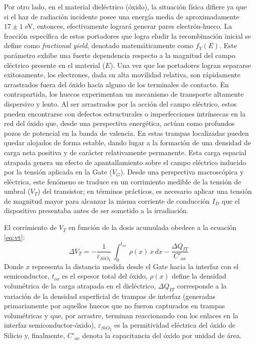 \documentclass[12pt,a4paper,oneside]{book}
\begin{document}
Por otro lado, en el material dieléctrico (óxido), la situación física difiere ya que si el haz de radiación incidente posee una energía media de aproximadamente $17 \pm 1$ eV, entonces, efectivamente logrará generar pares electrón-hueco. La fracción específica de estos portadores que logra eludir la recombinación inicial se define como \textit{fractional yield}, denotado matemáticamente como $f_Y(E)$. Este parámetro exhibe una fuerte dependencia respecto a la magnitud del campo eléctrico presente en el material ($E$). Una vez que los portadores logran separarse exitosamente, los electrones, dada su alta movilidad relativa, son rápidamente arrastrados fuera del óxido hacia alguno de los terminales de contacto. En contrapartida, los huecos experimentan un mecanismo de transporte altamente dispersivo y lento. Al ser arrastrados por la acción del campo eléctrico, estos pueden encontrarse con defectos estructurales o imperfecciones intrínsecas en la red del óxido que, desde una perspectiva energética, actúan como profundos pozos de potencial en la banda de valencia. En estas trampas localizadas pueden quedar alojados de forma estable, dando lugar a la formación de una densidad de carga neta positiva y de carácter relativamente permanente. Esta carga espacial atrapada genera un efecto de apantallamiento sobre el campo eléctrico inducido por la tensión aplicada en la Gate ($V_G$). Desde una perspectiva macroscópica y eléctrica, este fenómeno se traduce en un corrimiento medible de la tensión de umbral ($V_T$) del transistor; en términos prácticos, es necesario aplicar una tensión de magnitud mayor para alcanzar la misma corriente de conducción $I_D$ que el dispositivo presentaba antes de ser sometido a la irradiación.


El corrimiento de $V_T$ en función de la dosis acumulada obedece a la ecuación \eqref{eq:vt}:
\begin{equation}
\Delta V_T = - \frac{1}{\varepsilon_{SiO_2}}\,\int_0^{t_{ox}}\,\rho (x)\,x\,dx-\frac{\Delta Q_{IT}}{C'_{ox}}
\label{eq:vt}
\end{equation}
Donde $x$ representa la distancia medida desde el Gate hacia la interfaz con el semiconductor, $t_{ox}$ es el espesor total del óxido, $\rho(x)$ define la densidad volumétrica de la carga atrapada en el dieléctrico, $\Delta Q_{IT}$ corresponde a la variación de la densidad superficial de trampas de interfaz (generadas primariamente por aquellos huecos que no fueron capturados en trampas volumétricas y que, por arrastre, terminan reaccionando con los enlaces en la interfaz semiconductor-óxido), $\varepsilon_{SiO_2}$ es la permitividad eléctrica del óxido de Silicio y, finalmente, $C'_{ox}$ denota la capacitancia del óxido por unidad de área.
\end{document}
